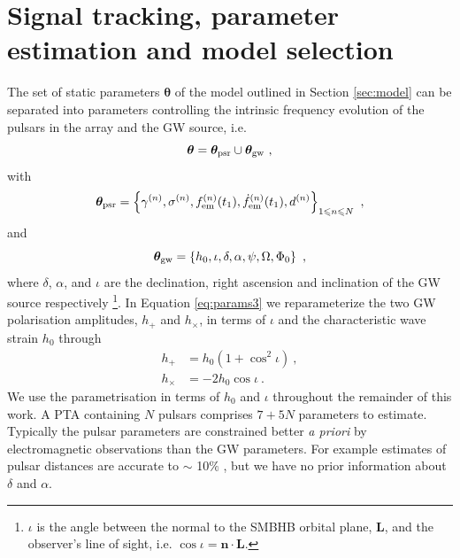 \documentclass[fleqn,usenatbib,useAMS]{mnras}
\providecommand{\DIFadd}[1]{{\protect\color{blue}\uwave{#1}}} %
\providecommand{\DIFaddbegin}{} %
\providecommand{\DIFaddend}{} %
\newcommand{\DIFaddincludegraphics}[2][]{{\color{blue}\fbox{\DIFOincludegraphics[#1]{#2}}}} %
\DeclareRobustCommand{\DIFaddbegin}{\DIFOaddbegin \let\includegraphics\DIFaddincludegraphics} %
\DeclareRobustCommand{\DIFaddend}{\DIFOaddend \let\includegraphics\DIFOincludegraphics} %
\begin{document}
\section{Signal tracking, parameter estimation and model selection} \label{sec:detect}
The set of static parameters $\boldsymbol{\theta}$ of the model outlined in Section \ref{sec:model} can be separated into parameters controlling the intrinsic frequency evolution of the pulsars in the array and the GW source, i.e. 
\begin{equation}
	\boldsymbol{\theta} =  \boldsymbol{\theta}_{\rm psr} \cup \boldsymbol{\theta}_{\rm gw} \ , \label{eq:params1}
\end{equation}
with
\begin{equation}
	\boldsymbol{\theta}_{\rm psr} = \left \{ \gamma^{(n)},\sigma^{(n)}, f_{\rm em}^{(n)}(t_1),\dot{f}_{\rm em}^{(n)}(t_1),d^{(n)}\right\}_{1\leq n \leq N} \ , \label{eq:psrparams}
\end{equation}
and
\begin{equation}
	\boldsymbol{\theta}_{\rm gw} = \left \{h_0, \iota, \delta, \alpha, \psi, \Omega, \Phi_0 \right \} \ ,  \label{eq:params3}
\end{equation}
where $\delta$, $\alpha$, and $\iota$ are the declination, right ascension and inclination of the GW source respectively \footnote{$\iota$ is the angle between the \DIFaddbegin \DIFadd{unit }\DIFaddend normal to the SMBHB orbital plane, $\boldsymbol{L}$, and the observer's line of sight, i.e. $\cos \iota = \boldsymbol{n} \cdot \boldsymbol{L}$.}. In Equation \eqref{eq:params3} we reparameterize the two GW polarisation amplitudes, $h_{+}$ and $h_{\times}$, in terms of $\iota$ and the characteristic wave strain $h_0$ through 
\begin{align}
	h_+ &= h_0(1 + \cos^2 \iota) 	\label{eq:hphx} \ ,\\
	h_{\times} &= -2h_0\cos \iota 	\label{eq:hphx2} \ .
\end{align}
We use the parametrisation in terms of $h_0$ and $\iota$ throughout the remainder of this work. A PTA containing $N$ pulsars comprises $7 + 5N$ parameters to estimate. Typically the pulsar parameters are constrained better \textit{a priori} by electromagnetic observations than the GW parameters. For example estimates of pulsar distances are accurate to $\sim$ 10$\%$ \citep{Cordes2002astro.ph..7156C, Verbiest2012ApJ...755...39V, Desvignes2016,Yao2017}, but we have no prior information about $\delta$ and $\alpha$. \newline 
\end{document}
